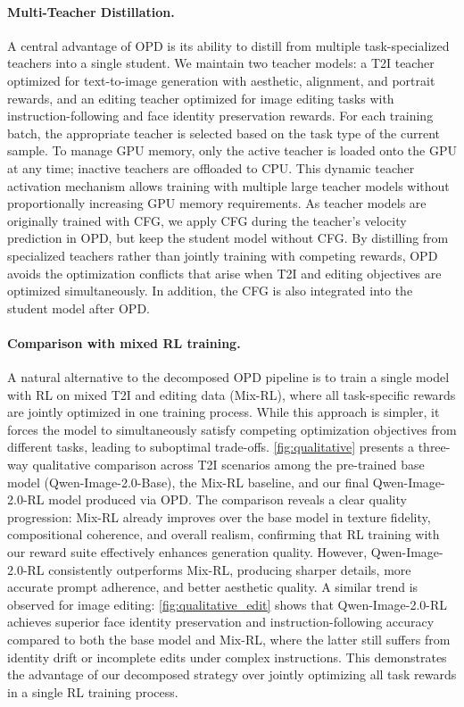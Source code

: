\documentclass{article} %
\begin{document}
\paragraph{Multi-Teacher Distillation.} A central advantage of OPD is its ability to distill from multiple task-specialized teachers into a single student. We maintain two teacher models: a T2I teacher optimized for text-to-image generation with aesthetic, alignment, and portrait rewards, and an editing teacher optimized for image editing tasks with instruction-following and face identity preservation rewards. For each training batch, the appropriate teacher is selected based on the task type of the current sample. To manage GPU memory, only the active teacher is loaded onto the GPU at any time; inactive teachers are offloaded to CPU. This dynamic teacher activation mechanism allows training with multiple large teacher models without proportionally increasing GPU memory requirements. As teacher models are originally trained with CFG, we apply CFG during the teacher's velocity prediction in OPD, but keep the student model without CFG. By distilling from specialized teachers rather than jointly training with competing rewards, OPD avoids the optimization conflicts that arise when T2I and editing objectives are optimized simultaneously. In addition, the CFG is also integrated into the student model after OPD.

\paragraph{Comparison with mixed RL training.} A natural alternative to the decomposed OPD pipeline is to train a single model with RL on mixed T2I and editing data (Mix-RL), where all task-specific rewards are jointly optimized in one training process. While this approach is simpler, it forces the model to simultaneously satisfy competing optimization objectives from different tasks, leading to suboptimal trade-offs. \cref{fig:qualitative} presents a three-way qualitative comparison across T2I scenarios among the pre-trained base model (Qwen-Image-2.0-Base), the Mix-RL baseline, and our final Qwen-Image-2.0-RL model produced via OPD. The comparison reveals a clear quality progression: Mix-RL already improves over the base model in texture fidelity, compositional coherence, and overall realism, confirming that RL training with our reward suite effectively enhances generation quality. However, Qwen-Image-2.0-RL consistently outperforms Mix-RL, producing sharper details, more accurate prompt adherence, and better aesthetic quality. A similar trend is observed for image editing: \cref{fig:qualitative_edit} shows that Qwen-Image-2.0-RL achieves superior face identity preservation and instruction-following accuracy compared to both the base model and Mix-RL, where the latter still suffers from identity drift or incomplete edits under complex instructions. This demonstrates the advantage of our decomposed strategy over jointly optimizing all task rewards in a single RL training process.
\end{document}
